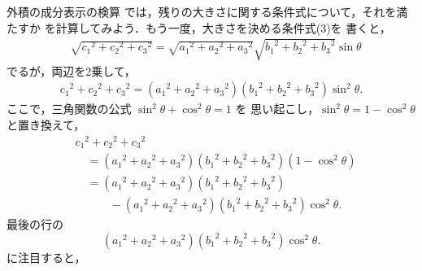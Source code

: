 \begin{mysmallsec}{外積の成分表示の検算}
                では，残りの大きさに関する条件式について，それを満たすか
                を計算してみよう．もう一度，大きさを決める条件式(3)を
                書くと，
                    \begin{align*}
                        &\sqrt{{c_{1}}^{2}+{c_{2}}^{2}+{c_{3}}^{2}}
                        =
                        \sqrt{{a_{1}}^{2}+{a_{2}}^{2}+{a_{3}}^{2}}
                        \sqrt{{b_{1}}^{2}+{b_{2}}^{2}+{b_{3}}^{2}}
                        \sin\theta
                    \end{align*}
                でるが，両辺を2乗して，
                    \begin{align*}
                        {c_{1}}^{2}+{c_{2}}^{2}+{c_{3}}^{2}
                        =
                        \left({a_{1}}^{2}+{a_{2}}^{2}+{a_{3}}^{2}\right)
                        \left({b_{1}}^{2}+{b_{2}}^{2}+{b_{3}}^{2}\right)
                        {\sin}^{2}\theta.
                    \end{align*}
                ここで，三角関数の公式 ${\sin}^{2}\theta + {\cos}^{2}\theta = 1$ を
                思い起こし，${\sin}^{2}\theta = 1 - {\cos}^{2}\theta $ と置き換えて，
                    \begin{align*}
                        &{c_{1}}^{2}+{c_{2}}^{2}+{c_{3}}^{2} \\
                        &\quad =    \left({a_{1}}^{2}+{a_{2}}^{2}+{a_{3}}^{2}\right)
                                    \left({b_{1}}^{2}+{b_{2}}^{2}+{b_{3}}^{2}\right)
                                    \left(1 - {\cos}^{2}\theta \right) \\
                        &\quad =    \left({a_{1}}^{2}+{a_{2}}^{2}+{a_{3}}^{2}\right)
                                    \left({b_{1}}^{2}+{b_{2}}^{2}+{b_{3}}^{2}\right) \\
                                    &\quad \qquad -\left({a_{1}}^{2}+{a_{2}}^{2}+{a_{3}}^{2}\right)
                                        \left({b_{1}}^{2}+{b_{2}}^{2}+{b_{3}}^{2}\right)
                                        {\cos}^{2}\theta.
                    \end{align*}
                最後の行の
                    \begin{equation*}
                        \left({a_{1}}^{2}+{a_{2}}^{2}+{a_{3}}^{2}\right)
                        \left({b_{1}}^{2}+{b_{2}}^{2}+{b_{3}}^{2}\right)
                        {\cos}^{2}\theta.
                    \end{equation*}
                に注目すると，

\end{mysmallsec}
